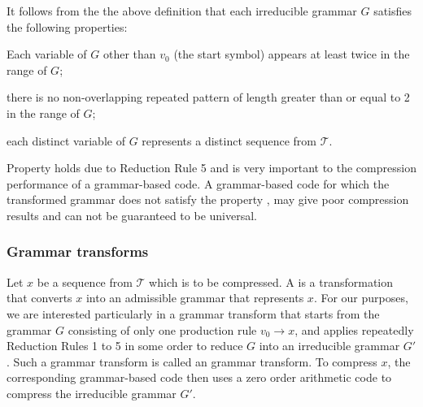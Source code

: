 

It follows from the the above definition that each irreducible grammar $G$ satisfies the following properties:

\begin{propertylist}
\item \label{property-b-1} Each variable of $G$ other than $v_0$ (the start symbol) appears at least twice in the range of $G$;
\item \label{property-b-2} there is no non-overlapping repeated pattern of length greater than or equal to 2 in the range of $G$;
\item \label{property-b-3} each distinct variable of $G$ represents a distinct sequence from $\mathcal{T}$.
\end{propertylist}

Property  holds due to Reduction Rule 5 and is very important to the compression performance of a grammar-based code. A grammar-based code for which the transformed grammar does not satisfy the property , may give poor compression results and can not be guaranteed to be universal.


\subsubsection{Grammar transforms}
Let $x$ be a sequence from $\mathcal{T}$ which is to be compressed. A  is a transformation that converts $x$ into an admissible grammar that represents $x$. For our purposes, we are interested particularly in a grammar transform that starts from the grammar $G$ consisting of only one production rule $v_0 \rightarrow x$, and applies repeatedly Reduction Rules 1 to 5 in some order to reduce $G$ into an irreducible grammar $G'$. Such a grammar transform is called an  grammar transform. To compress $x$, the corresponding grammar-based code then uses a zero order arithmetic code to compress the irreducible grammar $G'$. 

